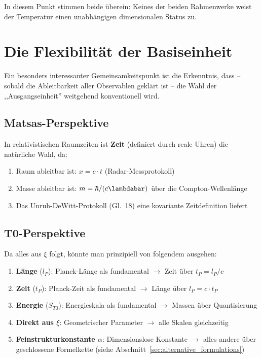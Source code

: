 	In diesem Punkt stimmen beide überein: Keines der beiden Rahmenwerke weist der Temperatur einen unabhängigen dimensionalen Status zu.
	
	\section{Die Flexibilität der Basiseinheit}
	
	Ein besonders interessanter Gemeinsamkeitspunkt ist die Erkenntnis, dass -- sobald die Ableitbarkeit aller Observablen geklärt ist -- die Wahl der ,,Ausgangseinheit'' weitgehend konventionell wird.
	
	\subsection{Matsas-Perspektive}
	
	In relativistischen Raumzeiten ist \textbf{Zeit} (definiert durch reale Uhren) die natürliche Wahl, da:
	\begin{enumerate}
		\item Raum ableitbar ist: $x = c \cdot t$ (Radar-Messprotokoll)
		\item Masse ableitbar ist: $m = \hbar / (c \lambdabar)$ über die Compton-Wellenlänge
		\item Das Unruh-DeWitt-Protokoll (Gl.~18) eine kovariante Zeitdefinition liefert
	\end{enumerate}
	
	\subsection{T0-Perspektive}
	
	Da alles aus $\xi$ folgt, könnte man prinzipiell von folgendem ausgehen:
	
	\begin{enumerate}
		\item \textbf{Länge} ($l_P$): Planck-Länge als fundamental $\to$ Zeit über $t_P = l_P/c$
		\item \textbf{Zeit} ($t_P$): Planck-Zeit als fundamental $\to$ Länge über $l_P = c \cdot t_P$
		\item \textbf{Energie} ($S_{T0}$): Energieskala als fundamental $\to$ Massen über Quantisierung
		\item \textbf{Direkt aus $\xi$}: Geometrischer Parameter $\to$ alle Skalen gleichzeitig
		\item \textbf{Feinstrukturkonstante $\alpha$}: Dimensionslose Konstante $\to$ alles andere über geschlossene Formelkette (siehe Abschnitt~\ref{sec:alternative_formulations})
	\end{enumerate}
	
